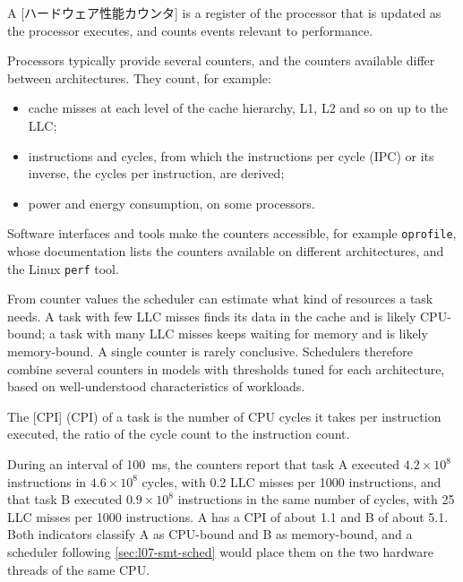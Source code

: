 \documentclass[../main.tex]{subfiles}
\begin{document}
\begin{definition}
  A [ハードウェア性能カウンタ] is a
  register of the processor that is updated as the processor executes, and
  counts events relevant to performance.
\end{definition}

Processors typically provide several counters, and the counters available
differ between architectures.  They count, for example:
\begin{itemize}
  \item cache misses at each level of the cache hierarchy, L1, L2 and so on
    up to the LLC;
  \item instructions and cycles, from which the instructions per cycle (IPC)
    or its inverse, the cycles per instruction, are derived;
  \item power and energy consumption, on some processors.
\end{itemize}
Software interfaces and tools make the counters accessible, for example
\texttt{oprofile}, whose documentation lists the counters available on
different architectures, and the Linux \texttt{perf} tool.

From counter values the scheduler can estimate what kind of resources a
task needs.  A task with few LLC misses finds its data in the cache and is
likely CPU-bound; a task with many LLC misses keeps waiting for memory and
is likely memory-bound.  A single counter is rarely conclusive.  Schedulers
therefore combine several counters in models with thresholds tuned for each
architecture, based on well-understood characteristics of workloads.

\begin{definition}
  The [CPI]%
   (CPI) of a task is the number of CPU cycles it takes per
  instruction executed, the ratio of the cycle count to the instruction
  count.
\end{definition}

\begin{example}
  During an interval of \SI{100}{\milli\second}, the counters report that
  task A executed $4.2 \times 10^8$ instructions in $4.6 \times 10^8$
  cycles, with 0.2 LLC misses per 1000 instructions, and that task B
  executed $0.9 \times 10^8$ instructions in the same number of cycles, with
  25 LLC misses per 1000 instructions.  A has a CPI of about 1.1 and B of
  about 5.1.  Both indicators classify A as CPU-bound and B as memory-bound,
  and a scheduler following \cref{sec:l07-smt-sched} would place them on the
  two hardware threads of the same CPU.
\end{example}
\end{document}
